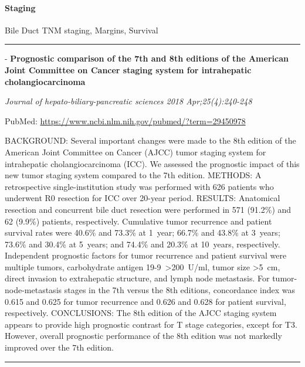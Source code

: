 \documentclass[]{article}
\let\oldparagraph\paragraph
\renewcommand{\paragraph}[1]{\oldparagraph{#1}\mbox{}}
\begin{document}
\hypertarget{staging-1}{%
\paragraph{Staging}\label{staging-1}}

Bile Duct TNM staging, Margins, Survival

\begin{center}\rule{0.5\linewidth}{\linethickness}\end{center}

 - \textbf{Prognostic comparison of the 7th and 8th editions of the
American Joint Committee on Cancer staging system for intrahepatic
cholangiocarcinoma}

\emph{Journal of hepato-biliary-pancreatic sciences 2018
Apr;25(4):240-248}

PubMed: \url{https://www.ncbi.nlm.nih.gov/pubmed/?term=29450978}

BACKGROUND: Several important changes were made to the 8th edition of
the American Joint Committee on Cancer (AJCC) tumor staging system for
intrahepatic cholangiocarcinoma (ICC). We assessed the prognostic impact
of this new tumor staging system compared to the 7th edition. METHODS: A
retrospective single-institution study was performed with 626 patients
who underwent R0 resection for ICC over 20-year period. RESULTS:
Anatomical resection and concurrent bile duct resection were performed
in 571 (91.2\%) and 62 (9.9\%) patients, respectively. Cumulative tumor
recurrence and patient survival rates were 40.6\% and 73.3\% at 1~year;
66.7\% and 43.8\% at 3~years; 73.6\% and 30.4\% at 5~years; and 74.4\%
and 20.3\% at 10~years, respectively. Independent prognostic factors for
tumor recurrence and patient survival were multiple tumors, carbohydrate
antigen 19-9~\textgreater{}200~U/ml, tumor size \textgreater{}5~cm,
direct invasion to extrahepatic structure, and lymph node metastasis.
For tumor-node-metastasis stages in the 7th versus the 8th editions,
concordance index was 0.615 and 0.625 for tumor recurrence and 0.626 and
0.628 for patient survival, respectively. CONCLUSIONS: The 8th edition
of the AJCC staging system appears to provide high prognostic contrast
for T stage categories, except for T3. However, overall prognostic
performance of the 8th edition was not markedly improved over the 7th
edition.

{}

{}

\begin{center}\rule{0.5\linewidth}{\linethickness}\end{center}
\end{document}

